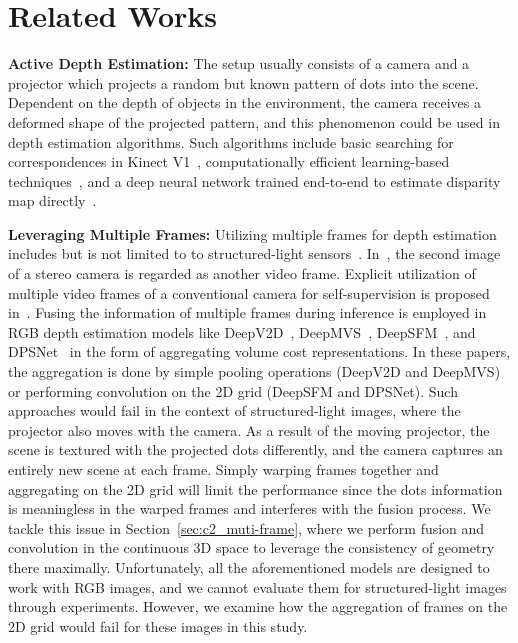 \section{Related Works} \label{sec:c2_related_work}

\noindent\textbf{Active Depth Estimation:} The setup usually consists of a camera and a projector which projects a random but known pattern of dots into the scene. Dependent on the depth of objects in the environment, the camera receives a deformed shape of the projected pattern, and this phenomenon could be used in depth estimation algorithms. Such algorithms include basic searching for correspondences in Kinect V1~\citep{martinez2013kinect}, computationally efficient learning-based techniques~\citep{fanello2017ultrastereo, ryan2016hyperdepth, chen2014fast}, and a deep neural network trained end-to-end to estimate disparity map directly~\citep{zhang2018activestereonet, kleitsiotis2019color, riegler2019connecting}.

\bigbreak\noindent\textbf{Leveraging Multiple Frames:} Utilizing multiple frames for depth estimation includes but is not limited to to structured-light sensors~\citep{riegler2019connecting}. In~\cite{godard2017unsupervised, xie2016deep3d, kuznietsov2017semi}, the second image of a stereo camera is regarded as another video frame. Explicit utilization of multiple video frames of a conventional camera for self-supervision is proposed in~\cite{zhan2018unsupervised, zhou2017unsupervised, bian2019unsupervised, godard2019digging, guizilini20203d, pillai2019superdepth, casser2019unsupervised}. Fusing the information of multiple frames during inference is employed in RGB depth estimation models like
DeepV2D~\citep{teed2019deepv2d}, DeepMVS~\citep{huang2018deepmvs}, DeepSFM~\citep{wei2020deepsfm}, and DPSNet~\citep{im2018dpsnet} in the form of aggregating volume cost representations. In these papers, the aggregation is done by simple pooling operations (DeepV2D and DeepMVS) or performing convolution on the 2D grid (DeepSFM and DPSNet). Such approaches would fail in the context of structured-light images, where the projector also moves with the camera. As a result of the moving projector, the scene is textured with the projected dots differently, and the camera captures an entirely new scene at each frame. Simply warping frames together and aggregating on the 2D grid will limit the performance since the dots information is meaningless in the warped frames and interferes with the fusion process. We tackle this issue in Section~\ref{sec:c2_muti-frame}, where we perform fusion and convolution in the continuous 3D space to leverage the consistency of geometry there maximally. Unfortunately, all the aforementioned models are designed to work with RGB images, and we cannot evaluate them for structured-light images through experiments. However, we examine how the aggregation of frames on the 2D grid would fail for these images in this study.

